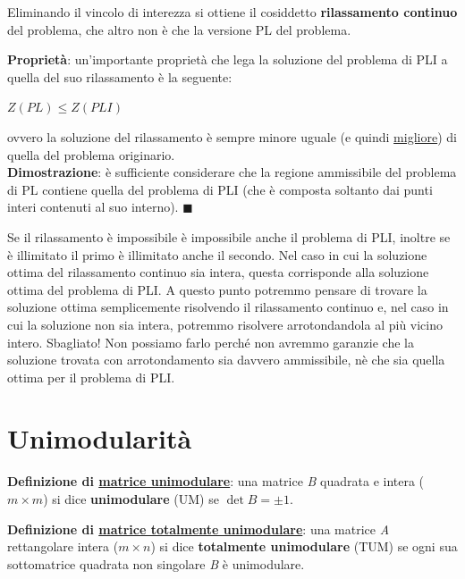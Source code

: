\documentclass[11pt, oneside]{book}
\begin{document}
Eliminando il vincolo di interezza si ottiene il cosiddetto {\bf
  rilassamento continuo} del problema, che altro non \`e che la
versione PL del problema. 

\par\bigskip

{\bf Propriet\`a}: un'importante propriet\`a che lega la soluzione del
problema di PLI a quella del suo rilassamento \`e la seguente:

\begin{center}
$Z(PL) \leq Z(PLI)$  
\end{center}

ovvero la soluzione del rilassamento \`e sempre minore uguale (e
quindi \underline{migliore}) di quella del problema originario.\\
{\bf Dimostrazione}: \`e sufficiente considerare che la regione
ammissibile del problema di PL contiene quella del problema di PLI
(che \`e composta soltanto dai punti interi contenuti al suo
interno). $\blacksquare$

\par\bigskip

Se il rilassamento \`e impossibile \`e impossibile anche il problema
di PLI, inoltre se \`e illimitato il primo \`e illimitato anche il
secondo.  Nel caso in cui la soluzione ottima del rilassamento
continuo sia intera, questa corrisponde alla soluzione ottima del
problema di PLI. A questo punto potremmo pensare di trovare la
soluzione ottima semplicemente risolvendo il rilassamento continuo e,
nel caso in cui la soluzione non sia intera, potremmo risolvere
arrotondandola al pi\`u vicino intero. Sbagliato! Non possiamo farlo
perch\'e non avremmo garanzie che la soluzione trovata con
arrotondamento sia davvero ammissibile, n\`e che sia quella ottima per
il problema di PLI.

\section{Unimodularit\`a}

{\bf Definizione di \underline{matrice unimodulare}}: una matrice {\em
  B} quadrata e intera ($m \times m$) si dice {\bf unimodulare} (UM)
se $\det{B} = \pm 1$.

\par\bigskip

{\bf Definizione di \underline{matrice totalmente unimodulare}}: una
matrice {\em A} rettangolare intera ($m \times n$) si dice {\bf
  totalmente unimodulare} (TUM) se ogni sua sottomatrice quadrata non
singolare {\em B} \`e unimodulare.
\end{document}
